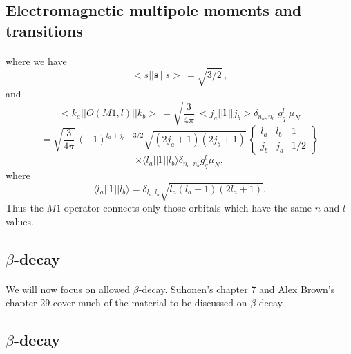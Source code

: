 \documentclass[%
oneside,                 %
final,                   %
10pt]{article}
\begin{document}
\subsection{Electromagnetic multipole moments and transitions}

\paragraph{}
where we have
\[
<s\vert\vert \mathbf{s}\,\vert\vert s>\, = \sqrt{3/2}\, ,
\]
and
\[
<k_{a}\vert\vert O(M1,l )\vert\vert k_{b}>\, =
\sqrt{ \frac{3}{4\pi }}\,
<j_{a}\vert\vert \mathbf{l}\,\vert\vert j_{b}> \delta _{n_{a},n_{b}} \; g^{l }_{q} \; \mu _{N}
\]
\[
=\sqrt{ \frac{3}{4\pi }}\,
(-1)^{l _{a}+j_{b}+3/2} \sqrt{(2j_{a}+1)(2j_{b}+1)}\,
   \left\{\begin{array}{ccc}  {l _{a}}&  {l _{b}} & {1}\\  {j_{b}}&  {j_{a}}&  {1/2}\end{array}\right\}
\]
\[
\times\langle l _{a}\vert\vert \mathbf{l}\,\vert\vert l _{b}\rangle \delta _{n_{a},n_{b}}g^{l }_{q}\mu _{N} ,       
\]
where
\[
\langle l _{a}\vert\vert \mathbf{l}\,\vert\vert l _{b}\rangle = \delta _{l _{a},l _{b}} \sqrt{l _{a}(l_{a}+1)(2l _{a}+1)}.
\]
Thus the $M1$ operator connects only
those orbitals which have the same $n$ and $l$ values.




\subsection{$\beta$-decay}

\paragraph{}
We will now focus on  allowed $\beta$-decay.  
Suhonen's chapter 7 and Alex Brown's chapter 29 cover much of the material to be discussed on $\beta$-decay.



\subsection{$\beta$-decay}

\end{document}
